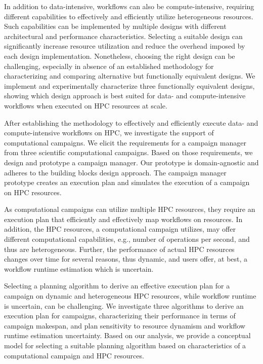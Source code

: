 In addition to data-intensive, workflows can also be compute-intensive,
requiring different capabilities to effectively and efficiently utilize
heterogeneous resources. Such capabilities can be implemented by multiple
designs with different architectural and performance characteristics. Selecting
a suitable design can significantly increase resource utilization and reduce the
overhead imposed by each design implementation. Nonetheless, choosing the right
design can be challenging, especially in absence of an established methodology
for characterizing and comparing alternative but functionally equivalent
designs. We implement and experimentally characterize three functionally
equivalent designs, showing which design approach is best suited for data- and
compute-intensive workflows when executed on HPC resources at scale.

After establishing the methodology to effectively and efficiently execute data-
and compute-intensive workflows on HPC, we investigate the support of
computational campaigns. We elicit the requirements for a campaign manager from
three scientific computational campaigns. Based on those requirements, we design
and prototype a campaign manager. Our prototype is domain-agnostic and adheres
to the building blocks design approach. The campaign manager prototype creates
an execution plan and simulates the execution of a campaign on HPC resources.

As computational campaigns can utilize multiple HPC resources, they require an
execution plan that efficiently and effectively map workflows on resources. In
addition, the HPC resources, a computational campaign utilizes, may offer
different computational capabilities, e.g., number of operations per second,
and thus are heterogeneous. Further, the performance of actual HPC resources
changes over time for several reasons, thus dynamic, and users offer, at best,
a workflow runtime estimation which is uncertain.

Selecting a planning algorithm to derive an effective execution plan for a
campaign on dynamic and heterogeneous HPC resources, while workflow runtime is
uncertain, can be challenging. We investigate three algorithms to derive an
execution plan for campaigns, characterizing their performance in terms of
campaign makespan, and plan sensitivity to resource dynamism and workflow
runtime estimation uncertainty. Based on our analysis, we provide a conceptual
model for selecting a suitable planning algorithm based on characteristics of a
computational campaign and HPC resources.

